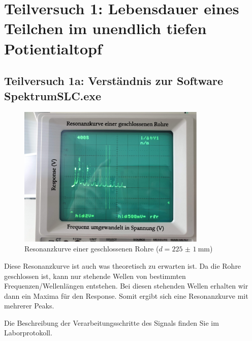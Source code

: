 \newcommand{\qm}{Quantenmechanik}

\section{Teilversuch 1: Lebensdauer eines Teilchen im unendlich tiefen Potientialtopf}
	\subsection{Teilversuch 1a: Verständnis zur Software SpektrumSLC.exe}
		\begin{figure}[!ht]
		    \centering
		    \includegraphics[width=0.8\textwidth]{./images/tv1a.eps}
		    \caption{Resonanzkurve einer geschlossenen Rohre ($d = \SI{225(1)}{\milli\meter}$)}
		    \label{fig:tv1a-osz}
		\end{figure}
		Diese Resonanzkurve ist auch was theoretisch zu erwarten ist. Da die Rohre geschlossen ist, kann nur stehende Wellen von bestimmten Frequenzen/Wellenlängen entstehen. Bei diesen stehenden Wellen erhalten wir dann ein Maxima für den Response. Somit ergibt sich eine Resonanzkurve mit mehrerer Peaks. 

		Die Beschreibung der Verarbeitungsschritte des Signals finden Sie im Laborprotokoll.

